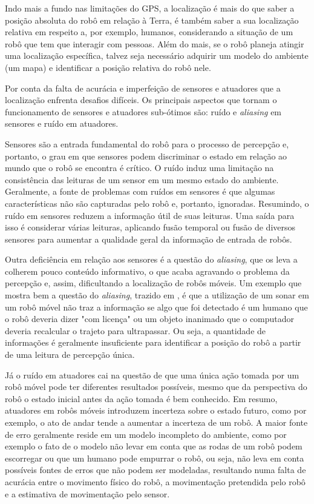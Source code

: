 \documentclass[acronym, symbols, table]{fei}
\begin{document}
			Indo mais a fundo nas limitações do GPS, a localização é mais do que saber a posição absoluta do robô em relação à Terra, é também saber a sua localização relativa em respeito a, por exemplo, humanos, considerando a situação de um robô que tem que interagir com pessoas. Além do mais, se o robô planeja atingir uma localização específica, talvez seja necessário adquirir um modelo do ambiente (um mapa) e identificar a posição relativa do robô nele. 
			
			Por conta da falta de acurácia e imperfeição de sensores e atuadores que a localização enfrenta desafios difíceis. Os principais aspectos que tornam o funcionamento de sensores e atuadores sub-ótimos são: ruído e \textit{aliasing} em sensores e ruído em atuadores.
			
			Sensores são a entrada fundamental do robô para o processo de percepção	e, portanto, o grau em que sensores podem discriminar o estado em relação ao mundo que o robô se encontra é crítico. O ruído induz uma limitação na consistência das leituras de um sensor em um mesmo estado do ambiente. Geralmente, a fonte de problemas com ruídos em sensores é que algumas características não são capturadas pelo robô e, portanto, ignoradas. Resumindo, o ruído em sensores reduzem a informação útil de suas leituras. Uma saída para isso é considerar várias leituras, aplicando fusão temporal ou fusão de diversos sensores para aumentar a qualidade geral da informação de entrada de robôs.
			
			Outra deficiência em relação aos sensores é a questão do \textit{aliasing}, que os leva a colherem pouco conteúdo informativo, o que acaba agravando o problema da percepção e, assim, dificultando a localização de robôs móveis. Um exemplo que mostra bem a questão do \textit{aliasing}, trazido em \textcite{siegwart2011introduction}, é que a utilização de um sonar em um robô móvel não traz a informação se algo que foi detectado é um humano que o robô deveria dizer "com licença" ou um objeto inanimado que o computador deveria recalcular o trajeto para ultrapassar. Ou seja, a quantidade de informações é geralmente insuficiente para identificar a posição do robô a partir de uma leitura de percepção única.
			
			Já o ruído em atuadores cai na questão de que uma única ação tomada por um robô móvel pode ter diferentes resultados possíveis, mesmo que da perspectiva do robô o estado inicial antes da ação tomada é bem conhecido. Em resumo, atuadores em robôs móveis introduzem incerteza sobre o estado futuro, como por exemplo, o ato de andar tende a aumentar a incerteza de um robô. A maior fonte de erro geralmente reside em um modelo incompleto do ambiente, como por exemplo o fato de o modelo não levar em conta que as rodas de um robô podem escorregar ou que um humano pode empurrar o robô, ou seja, não leva em conta possíveis fontes de erros que não podem ser modeladas, resultando numa falta de acurácia entre o movimento físico do robô, a movimentação pretendida pelo robô e a estimativa de movimentação pelo sensor.
		
\end{document}
